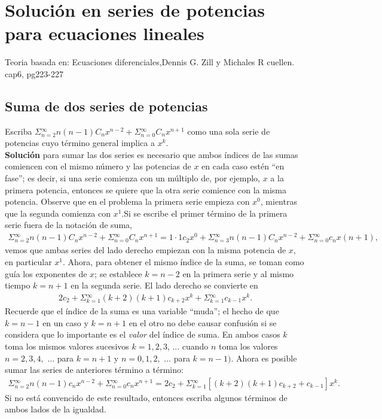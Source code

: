 \documentclass[12pt,letterpaper,oneside]{article}
\begin{document}
\section{Solución en series de potencias para ecuaciones lineales}
Teoria basada en: Ecuaciones diferenciales,Dennis G. Zill y Michales R cuellen. cap6, pg223-227
\subsection{Suma de dos series de potencias }
Escriba $\Sigma{^\infty_{n=2}} n(n-1)C_nx^{n-2} + \Sigma{^\infty_{n=0}} C_nx^{n+1}$ como una sola serie de potencias cuyo término general implica a $x^k$.\vspace{0.3cm}\\
\textbf{Solución} para sumar las dos series es necesario que ambos índices de las sumas comiencen con el mismo número y las potencias de $x$ en cada caso estén “en fase”; es decir, si una serie comienza con un múltiplo de, por ejemplo, $x$ a la primera potencia, entonces se quiere que la otra serie comience con la misma potencia. Observe que en el problema la primera serie empieza con $x^0$, mientras que la segunda comienza con $x^1$.Si se escribe el primer término de la primera serie fuera de la notación de suma,\\
\begin{align*}
\Sigma{^\infty_{n=2}} n(n-1)C_nx^{n-2} + \Sigma{^\infty_{n=0}} C_nx^{n+1} = 1\cdot 1c_2x^0 + \Sigma{^\infty_{n=3}} n(n-1)C_nx^{n-2} + \Sigma{^\infty_{n=0}} c_nx(n+1),
\end{align*}
vemos que ambas series del lado derecho empiezan con la misma potencia de $x$, en particular $x^1$. Ahora, para obtener el mismo índice de la suma, se toman como guía los exponentes de $x$; se establece $k = n - 2$ en la primera serie y al mismo tiempo $k = n + 1$ en la segunda serie. El lado derecho se convierte en\\
\begin{align*}
2c_2 + \Sigma{^\infty_{k=1}} (k + 2)(k + 1) c_{k+2}x^k + \Sigma{^\infty_{k=1}} c_{k-1}x^k.
\end{align*}
Recuerde que el índice de la suma es una variable “muda”; el hecho de que $k = n - 1$ en un caso y $k = n + 1$ en el otro no debe causar confusión si se considera que lo importante es el \textit{valor} del índice de suma. En ambos casos $k$ toma los mismos valores sucesivos $k = 1, 2, 3$, ... cuando $n$ toma los valores $n = 2, 3, 4,$ ... para $k = n + 1$ y $n = 0, 1, 2,$ ... para $k = n - 1)$. Ahora es posible sumar las series de anteriores término a término:
\begin{align*}
\Sigma{^\infty_{n=2}} n(n-1)c_nx^{n-2} + \Sigma{^\infty_{n=0}} c_nx^{n+1} = 2c_2 + \Sigma{^\infty_{k=1}} [(k+2)(k+1) c_{k+2} + c_{k-1}]x^k.
\end{align*}
Si no está convencido de este resultado, entonces escriba algunos términos de ambos lados de la igualdad.\vspace{0.3cm}\\
\end{document}
